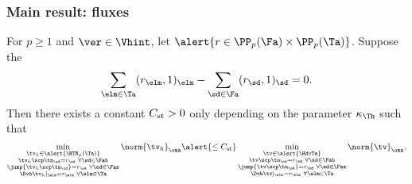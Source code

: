 \documentclass[compress]{beamer}
\newcommand{\cblue}[1]{{\color{blue}{#1}}}
\begin{document}
\begin{frame}
\frametitle{Main result: fluxes}

 \label{thm_Hdv_ext} For $p \ge 1$ and $\ver \in
\Vhint$, let $\alert{r \in \PP_{p}(\Fa) \times \PP_p(\Ta)}$. Suppose the
\cblue{compatibility}
%
\[
    \sum_{\elm \in \Ta} (r_\elm, 1)_\elm - \sum_{\sd \in
    \Fa} (r_\sd, 1)_\sd = 0.
\]
%
Then there exists a constant $C_{\rm st} > 0$ only depending on the
\cblue{shape-regularity} parameter $\kappa_{\Th}$ such that
%
\[
    \min_{\substack{\tv_h \in \alert{\RTN_p(\Ta)}\\
    \tv_h \scp \tn_\sd = r_\sd \,\, \forall \sd \in \Fab\\
    \jump{\tv_h \scp \tn_\sd} = r_\sd \,\, \forall \sd \in \Fas\\
    \Dvb \tv_h|_\elm = r_\elm \,\, \forall \elm \in \Ta}}
    \norm{\tv_h}_\oma \alert{\leq C_{\rm st}}
    \min_{\substack{\tv \in \alert{\HdvTa}\\
    \tv \scp \tn_\sd = r_\sd \,\, \forall \sd \in \Fab\\
    \jump{\tv \scp \tn_\sd} = r_\sd \,\, \forall \sd \in \Fas\\
    \Dvb \tv|_\elm = r_\elm \,\, \forall \elm \in \Ta}}
    \norm{\tv}_\oma.
\]
%
\et

\end{frame}
\end{document}

